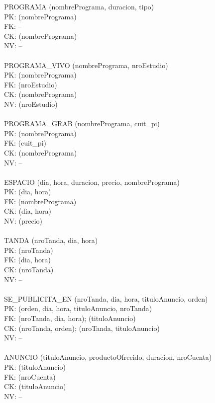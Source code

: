 \documentclass[a4paper,10pt,titlepage]{article}
\begin{document}
PROGRAMA (nombrePrograma, duracion, tipo)\\
PK: (nombrePrograma)\\
FK: --\\
CK: (nombrePrograma)\\
NV: --\\
\\
PROGRAMA\_VIVO (nombrePrograma, nroEstudio)\\
PK: (nombrePrograma)\\
FK: (nroEstudio)\\
CK: (nombrePrograma)\\
NV: (nroEstudio)\\
\\
PROGRAMA\_GRAB (nombrePrograma, cuit\_pi)\\
PK: (nombrePrograma)\\
FK: (cuit\_pi)\\
CK: (nombrePrograma)\\
NV: --\\
\\
ESPACIO (dia, hora, duracion, precio, nombrePrograma)\\
PK: (dia, hora)\\
FK: (nombrePrograma)\\
CK: (dia, hora)\\
NV: (precio)\\
\\
TANDA (nroTanda, dia, hora)\\
PK: (nroTanda)\\
FK: (dia, hora)\\
CK: (nroTanda)\\
NV: --\\
\\
SE\_PUBLICITA\_EN (nroTanda, dia, hora, tituloAnuncio, orden)\\
PK: (orden, dia, hora, tituloAnuncio, nroTanda)\\
FK: (nroTanda, dia, hora); (tituloAnuncio)\\
CK: (nroTanda, orden); (nroTanda, tituloAnuncio)\\
NV: --\\
\\
ANUNCIO (tituloAnuncio, productoOfrecido, duracion, nroCuenta)\\
PK: (tituloAnuncio)\\
FK: (nroCuenta)\\
CK: (tituloAnuncio)\\
NV: --\\
\\
\end{document}
